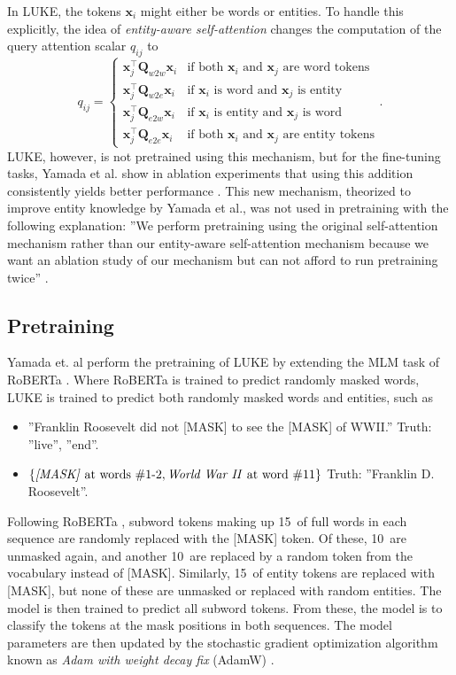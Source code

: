 \documentclass[main.tex]{subfiles}
\begin{document}
In LUKE, the tokens $\mathbf x_i$ might either be words or entities.
To handle this explicitly, the idea of \emph{entity-aware self-attention} changes the computation of the query attention scalar $q_{ij}$ to
\begin{equation}
    q_{ij} = 
    \begin{cases}
    \mathbf x_j^\top \mathbf Q_{w2w} \mathbf x_i  & \text{if both $\mathbf x_i$ and $\mathbf x_j$ are word tokens}\\
    \mathbf x_j^\top \mathbf Q_{w2e} \mathbf x_i & \text{if $\mathbf x_i$ is word and $\mathbf x_j$ is entity}\\
    \mathbf x_j^\top \mathbf Q_{e2w} \mathbf x_i & \text{if $\mathbf x_i$ is entity and $\mathbf x_j$ is word}\\
    \mathbf x_j^\top \mathbf Q_{e2e} \mathbf x_i & \text{if both $\mathbf x_i$ and $\mathbf x_j$ are entity tokens}
    \end{cases}.
\end{equation}
LUKE, however, is not pretrained using this mechanism, but for the fine-tuning tasks, Yamada et al. show in ablation experiments that using this addition consistently yields better performance \cite[Sec. 5.2]{yamada2020luke}.
This new mechanism, theorized to improve entity knowledge by Yamada et al., was  not used in pretraining with the following explanation:
''We perform pretraining using the original self-attention mechanism rather than our entity-aware self-attention mechanism because we want an ablation study of our mechanism but can not afford to run pretraining twice'' \cite[Sec. 3.4]{yamada2020luke}.

\subsection{Pretraining}
\label{subsec:lukepre}
Yamada et. al perform the pretraining of LUKE by extending the MLM task of RoBERTa \cite{liu2019roberta}.
Where RoBERTa is trained to predict randomly masked words, LUKE is trained to predict both randomly masked words and entities, such as
\begin{itemize}
    \item ''Franklin Roosevelt did not [MASK] to see the [MASK] of WWII.''
        \subitem Truth: ''live'', ''end''.
    \item $\{\text{\emph{[MASK]} at words \#1-2}, \text{\emph{World War II} at word \#11}\}$
        \subitem Truth: ''Franklin D. Roosevelt''.
\end{itemize}
Following RoBERTa \cite{liu2019roberta}, subword tokens making up 15\pro\ of full words in each sequence are randomly replaced with the [MASK] token.
Of these, 10\pro\ are unmasked again, and another 10\pro\ are replaced by a random token from the vocabulary instead of [MASK].
Similarly, 15\pro\ of entity tokens are replaced with [MASK], but none of these are unmasked or replaced with random entities.
The model is then trained to predict all subword tokens.
From these, the model is to classify the tokens at the mask positions in both sequences.
The model parameters are then updated by the stochastic gradient optimization algorithm known as \emph{Adam with weight decay fix} (AdamW) \cite{hutter2019adamw}.
\end{document}
